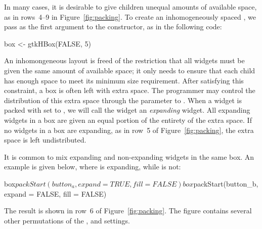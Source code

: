 In many cases, it is desirable to give children unequal amounts of
available space, as in rows~4--9 in Figure~\ref{fig:packing}. 
To create an inhomogeneously spaced , we pass
 as the first argument to the constructor, as in the
following code:
\begin{Schunk}
\begin{Sinput}
 box <- gtkHBox(FALSE, 5)
\end{Sinput}
\end{Schunk}

An inhomongeneous layout is freed of the restriction that all widgets
must be given the same amount of available space; it only needs to
ensure that each child has enough space to meet its minimum size
requirement. After satisfying this constraint, a box is often left
with extra space. The programmer may control the distribution of this
extra space through the  parameter
to .  When a widget is packed with
 set to , we will call
the widget an \emph{expanding} widget. All expanding widgets in a box
are given an equal portion of the entirety of the extra space. If no
widgets in a box are expanding, as in row~5 of
Figure~\ref{fig:packing}, the extra space is left undistributed. 

It is common to mix expanding and non-expanding widgets in the same
box.
An example is given below, where  is expanding,
while  is not:
%
\begin{Schunk}
\begin{Sinput}
 box$packStart(button_a, expand = TRUE, fill = FALSE)
 box$packStart(button_b, expand = FALSE, fill = FALSE)
\end{Sinput}
\end{Schunk}
%
The result is shown in row~6 of Figure~\ref{fig:packing}.  The figure
contains several other permutations of the
,
 and
 settings.

